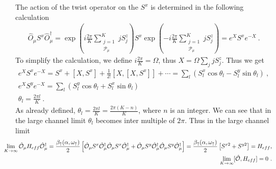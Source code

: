 \documentclass[12pt]{iopart}
\begin{document}
The action of the twist operator on the $S^x$ is determined in the following calculation
\begin{eqnarray}
\hat{O}_{\mu} S^x \hat{O}^{\dagger}_{\mu} = \exp({i\frac{2\pi}{K} \displaystyle\sum_{\substack{j=1\\ \mathcal{P}_{\mu}}}^{K} j S_j^z} )S^x \exp({-i\frac{2\pi}{K} \displaystyle\sum_{\substack{j=1\\ \mathcal{P}_{\mu}}}^{K} j S_j^z} ) = e^{X} S^x e^{-X}~.
\end{eqnarray}
To simplify the calculation, we define $i\frac{2\pi}{K}=\Omega$, thus $X=\Omega\sum_j jS^z_j$. Thus we get
\begin{eqnarray}
e^X S^x e^{-X}= S^x+[X,S^x] + \frac{1}{2!}[X,[X,S^x]] +\cdots = \sum_l ( S^x_l \cos \theta_l -  S_l^y \sin \theta_l ) ~,\nonumber\\
e^X S^y e^{-X}= \sum_l  (S^y_l \cos\theta_l  + S^x_l \sin\theta_l)\nonumber\\
\theta_l=\frac{2\pi l}{K}~.
\end{eqnarray}
As already defined, $\theta_l=\frac{2\pi l}{K}=\frac{2\pi (K-n)}{K}$, where $n$ is an integer. We can see that in the large channel limit $\theta_l $ becomes inter multiple of $2\pi$. Thus in the large channel limit
\begin{eqnarray}
	\hspace*{-20pt}\lim_{K\rightarrow \infty}\hat{\mathcal{O}}_{\mu} H_{eff} \hat{\mathcal{O}}_{\mu}^{\dagger}\nonumber = \frac{\beta_{\uparrow}(\alpha,\omega_{\uparrow})}{2} \left[ \hat{\mathcal{O}}_{\mu} S^x \hat{\mathcal{O}}_{\mu}^{\dagger} \hat{\mathcal{O}}_{\mu} S^x \hat{\mathcal{O}}_{\mu}^{\dagger}  + \hat{\mathcal{O}}_{\mu} S^y \hat{\mathcal{O}}_{\mu}^{\dagger} \hat{\mathcal{O}}_{\mu} S^y \hat{\mathcal{O}}_{\mu}^{\dagger}  \right] = \frac{\beta_{\uparrow}(\alpha,\omega_{\uparrow})}{2} \left[  S^{x2}+S^{y2}  \right] = H_{eff},\\
\hspace*{-20pt} \lim_{K\rightarrow \infty } [\hat{\mathcal{O}},H_{eff}] = 0~.
\label{eq:hamiltonian_twisted}
\end{eqnarray}
 
\end{document}
